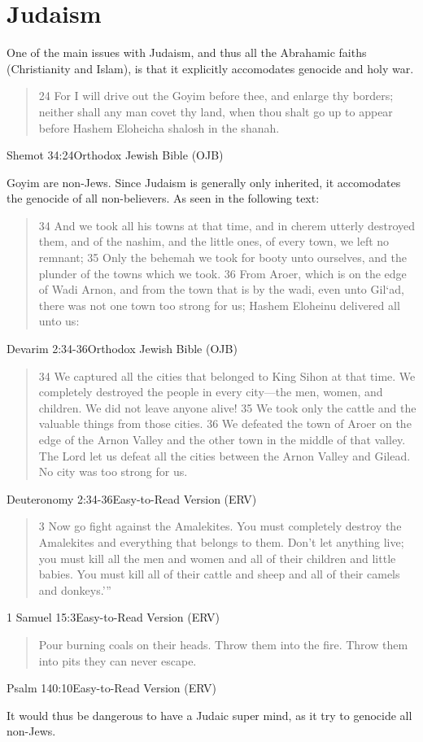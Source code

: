 \section{Judaism}
One of the main issues with Judaism, and thus all the Abrahamic faiths
(Christianity and Islam), is that
it explicitly accomodates genocide and holy war. 

\blockquote{24 For I will drive out the Goyim before thee, and enlarge thy borders; 
neither shall any man covet thy land, when thou shalt go up to appear before 
Hashem Eloheicha shalosh in the shanah.
}{Shemot 34:24Orthodox Jewish Bible (OJB)}

Goyim are non-Jews.  Since Judaism is generally only inherited, it accomodates 
the genocide of all non-believers. As seen in the following text:

\blockquote{34 And we took all his towns at that time, and in cherem utterly
destroyed them, and of the nashim, and the little ones, of every town, we left
no remnant;
35 Only the behemah we took for booty unto ourselves, and the plunder of the
towns which we took.
36 From Aroer, which is on the edge of Wadi Arnon, and from the town that is by
the wadi, even unto Gil‘ad, there was not one town too strong for us; Hashem
Eloheinu delivered all unto us:
} {Devarim 2:34-36Orthodox Jewish Bible (OJB)}

\blockquote{34 We captured all the cities that belonged to King Sihon at that time. We
completely destroyed the people in every city—the men, women, and children. We
did not leave anyone alive! 35 We took only the cattle and the valuable things
from those cities. 36 We defeated the town of Aroer on the edge of the Arnon
Valley and the other town in the middle of that valley. The Lord let us defeat
all the cities between the Arnon Valley and Gilead. No city was too strong for
us. 
}{Deuteronomy 2:34-36Easy-to-Read Version (ERV)}

\blockquote{3 Now go fight against the Amalekites. You must completely destroy the
Amalekites and everything that belongs to them. Don’t let anything live; you
must kill all the men and women and all of their children and little babies. You
must kill all of their cattle and sheep and all of their camels and donkeys.’”
}{ 1 Samuel 15:3Easy-to-Read Version (ERV)}

\blockquote{Pour burning coals on their heads.
    Throw them into the fire.
    Throw them into pits they can never escape.
}{Psalm 140:10Easy-to-Read Version (ERV)}

It would thus be dangerous to have a Judaic super mind, 
as it try to genocide all non-Jews. 

